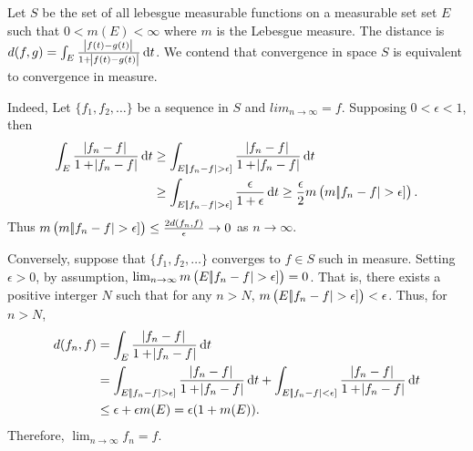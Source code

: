 \begin{example}
Let $S$ be the set of all lebesgue measurable functions on a measurable set 
set $E$ such that $0 < m(E) < \infty$ where $m$ is the Lebesgue measure. 
The distance is $d(f, g) = \int_{E} \frac{\abs{f(t) - g(t)}}
{1 + \abs{f(t) - g(t)}} \mathop{}\!\mathrm{d} t$. 
We contend that convergence in space $S$ is equivalent to convergence in 
measure. 

Indeed, Let $\{f_1, f_2, \ldots\}$ be a sequence in $S$ and $lim_{n \to 
\infty} = f$. 
Supposing $0 < \epsilon < 1$, then 
\begin{equation*}
    \begin{aligned}
        \int_E \frac{\abs{f_n - f}}{1 + \abs{f_n - f}} \mathop{}\!\mathrm{d} t 
        &\ge \int_{E[\abs{f_n - f} > \epsilon]} 
        \frac{\abs{f_n - f}}{1 + \abs{f_n - f}} \mathop{}\!\mathrm{d} t \\ 
        &\ge \int_{E[\abs{f_n - f} > \epsilon]} 
        \frac{\epsilon}{1 + \epsilon} \mathop{}\!\mathrm{d} t 
        \ge \frac{\epsilon}{2} m\left( m[\abs{f_n - f} > \epsilon] \right).        
    \end{aligned}
\end{equation*}
Thus $m\left( m[\abs{f_n - f} > \epsilon] \right) 
\le \frac{2d(f_n, f)}{\epsilon} \to 0$ as $n \to \infty$. 

Conversely, suppose that $\{f_1, f_2, \ldots\}$ converges to $f \in S$ such 
in measure. 
Setting $\epsilon > 0$, by assumption, $\lim_{n \to \infty} m\left( 
E[\abs{f_n - f} > \epsilon] \right) = 0$. 
That is, there exists a positive interger $N$ such that for any $n > N$, 
$m\left(E[\abs{f_n - f} > \epsilon] \right) < \epsilon$. 
Thus, for $n > N$, 
\begin{equation*}
    \begin{aligned}
        d(f_n, f) &= \int_E \frac{\abs{f_n - f}}{1 + \abs{f_n - f}} \mathop{}\!\mathrm{d} t \\
        &= \int_{E[\abs{f_n - f} > \epsilon]} \frac{\abs{f_n - f}}{1 + \abs{f_n - f}} \mathop{}\!\mathrm{d} t + 
        \int_{E[\abs{f_n - f} < \epsilon]} \frac{\abs{f_n - f}}{1 + \abs{f_n - f}} \mathop{}\!\mathrm{d} t \\
        &\le \epsilon + \epsilon  m(E)
        = \epsilon (1 + m(E)). 
    \end{aligned}
\end{equation*}
Therefore, $\lim_{n \to \infty} f_n = f$. 
\end{example}

